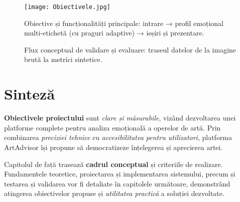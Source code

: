 \begin{figure}[htbp]
  \centering
  \texttt{[image: Obiectivele.jpg]}
  \caption{Obiective și funcționalități principale: intrare → profil emoțional multi-etichetă (cu praguri adaptive) → ieșiri și prezentare.}
  \label{fig:obj-schematic}
\end{figure}

\begin{figure}[htbp]
  \centering
  \caption{Flux conceptual de validare și evaluare: traseul datelor de la imagine brută la metrici sintetice.}
  \label{fig:val-flow}
\end{figure}

\section{Sinteză}
\label{sec:obiective-sinteza}

\textbf{Obiectivele proiectului} sunt \emph{clare și măsurabile}, vizând dezvoltarea unei platforme complete pentru analiza emoțională a operelor de artă. Prin combinarea \textit{preciziei tehnice} cu \emph{accesibilitatea pentru utilizatori}, platforma ArtAdvisor își propune să democratizeze înțelegerea și aprecierea artei.

Capitolul de față trasează \textbf{cadrul conceptual} și criteriile de realizare. Fundamentele teoretice, proiectarea și implementarea sistemului, precum și testarea și validarea vor fi detaliate în capitolele următoare, demonstrând atingerea obiectivelor propuse și \textit{utilitatea practică} a soluției dezvoltate.

